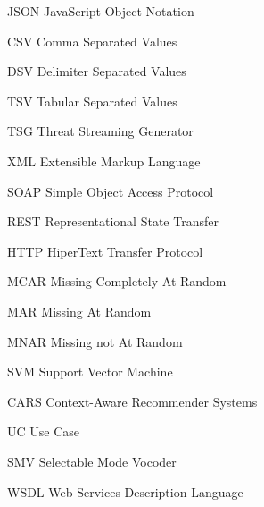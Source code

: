 \documentclass[
	12pt,				%
	openright,			%
	oneside,			%
	a4paper,			%
	english,			%
	brazil				%
	]{abntex2}
\newcommand{\listofquadrosname}{Lista de quadros}
\begin{document}

\listoffigures*
\cleardoublepage


\listoftables*
\cleardoublepage

\begin{siglas}
  \item[JSON] JavaScript Object Notation
  \item[CSV] Comma Separated Values
  \item[DSV] Delimiter Separated Values
  \item[TSV] Tabular Separated Values
  \item[TSG] Threat Streaming Generator
  \item[XML] Extensible Markup Language
  \item[SOAP] Simple Object Access Protocol
  \item[REST] Representational State Transfer
  \item[HTTP] HiperText Transfer Protocol
  \item[MCAR] Missing Completely At Random
  \item[MAR] Missing At Random
  \item[MNAR] Missing not At Random
  \item[SVM] Support Vector Machine
  \item[CARS] Context-Aware Recommender Systems
  \item[UC] Use Case
  \item[SMV] Selectable Mode Vocoder
  \item[WSDL] Web Services Description Language
  
\end{siglas}

\end{document}
